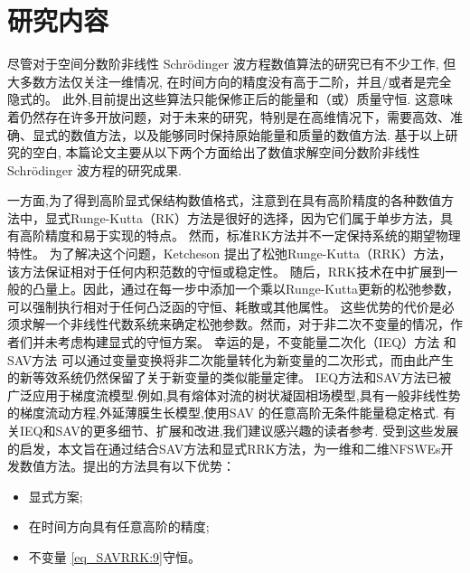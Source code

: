 \section{研究内容}

尽管对于空间分数阶非线性 Schr{\"o}dinger 波方程数值算法的研究已有不少工作, 但大多数方法仅关注一维情况, 在时间方向的精度没有高于二阶，并且/或者是完全隐式的。
此外,目前提出这些算法只能保修正后的能量和（或）质量守恒.
这意味着仍然存在许多开放问题，对于未来的研究，特别是在高维情况下，需要高效、准确、显式的数值方法，以及能够同时保持原始能量和质量的数值方法.
基于以上研究的空白, 本篇论文主要从以下两个方面给出了数值求解空间分数阶非线性 Schr{\"o}dinger 波方程的研究成果.

一方面,为了得到高阶显式保结构数值格式，注意到在具有高阶精度的各种数值方法中，显式Runge-Kutta（RK）方法是很好的选择，因为它们属于单步方法，具有高阶精度和易于实现的特点。
然而，标准RK方法并不一定保持系统的期望物理特性。
为了解决这个问题，Ketcheson \cite{ketchesonRelaxationRungeKutta2019} 提出了松弛Runge-Kutta（RRK）方法，该方法保证相对于任何内积范数的守恒或稳定性。
随后，RRK技术在\cite{ranochaRelaxationRungeKutta2020}中扩展到一般的凸量上。因此，通过在每一步中添加一个乘以Runge-Kutta更新的松弛参数，可以强制执行相对于任何凸泛函的守恒、耗散或其他属性。
这些优势的代价是必须求解一个非线性代数系统来确定松弛参数。然而，对于非二次不变量的情况，作者们并未考虑构建显式的守恒方案。
幸运的是，不变能量二次化（IEQ）方法 \cite{yangLinearUnconditionallyEnergy2017, yangEfficientLinearSchemes2017} 和SAV方法 \cite{chengConvergenceEnergyconservingScheme2022} 可以通过变量变换将非二次能量转化为新变量的二次形式，而由此产生的新等效系统仍然保留了关于新变量的类似能量定律。
IEQ方法和SAV方法已被广泛应用于梯度流模型.例如,具有熔体对流\cite{chenEfficientNumericalScheme2019}的树状凝固相场模型,具有一般非线性势的梯度流动方程\cite{yangConvergenceAnalysisInvariant2020d},外延薄膜生长模型\cite{chengHighlyEfficientAccurate2019},使用SAV \cite{gongArbitrarilyHighorderUnconditionally2019}的任意高阶无条件能量稳定格式.
有关IEQ和SAV的更多细节、扩展和改进,我们建议感兴趣的读者参考\cite{zhaoNumericalApproximationsPhase2017,shenScalarAuxiliaryVariable2018,liuExponentialScalarAuxiliary2020,chengMultipleScalarAuxiliary2018}.
受到这些发展的启发，本文旨在通过结合SAV方法和显式RRK方法，为一维和二维NFSWEs开发数值方法。提出的方法具有以下优势：
\begin{itemize}
	\item 显式方案;
	\item 在时间方向具有任意高阶的精度;
	\item 不变量 \eqref{eq_SAVRRK:9}守恒。
\end{itemize}


